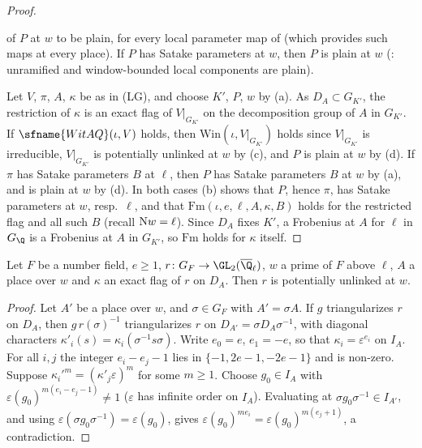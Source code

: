 \begin{proof}
\begin{enumerate}[label=(\alph*)]
  of $P$ at $w$ to be plain, for every local parameter map of  (which
  provides such maps at every place). If $P$ has Satake parameters at $w$, then $P$ is plain at $w$
  (: unramified and window-bounded local components are plain).
\end{enumerate}
Let $V$, $\pi$, $A$, $\kappa$ be as in \textup{(LG)}, and choose $K'$, $P$, $w$ by (a). As $D_A\subset G_{K'}$, the
restriction of $\kappa$ is an exact flag of $V|_{G_{K'}}$ on the decomposition group of $A$ in $G_{K'}$. If
$\sfname{WitAQ}(\iota,V)$ holds, then $\mathrm{Win}(\iota,V|_{G_{K'}})$ holds since $V|_{G_{K'}}$ is irreducible,
$V|_{G_{K'}}$ is potentially unlinked at $w$ by (c), and $P$ is plain at $w$ by (d). If $\pi$ has Satake
parameters $B$ at $\ell$, then $P$ has Satake parameters $B$ at $w$ by (a), and is plain at $w$ by (d). In both
cases (b) shows that $P$, hence $\pi$, has Satake parameters at $w$, resp.\ $\ell$, and that
$\mathrm{Fm}(\iota,e,\ell,A,\kappa,B)$ holds for the restricted flag and all such $B$ (recall $\mathrm{N} w=\ell$).
Since $D_A$ fixes $K'$, a Frobenius at $A$ for $\ell$ in $G_\Q$ is a Frobenius at $A$ in $G_{K'}$, so
$\mathrm{Fm}$ holds for $\kappa$ itself.
\end{proof}

\begin{lemma}\label{pf:kato:potof}
Let $F$ be a number field, $e\ge1$, $r\colon G_F\to\GL_2(\katoQlb)$, $w$ a prime of $F$ above $\ell$, $A$ a place
over $w$ and $\kappa$ an exact flag of $r$ on $D_A$. Then $r$ is potentially unlinked at $w$.
\end{lemma}

\begin{proof}
Let $A'$ be a place over $w$, and $\sigma\in G_F$ with $A'=\sigma A$. If $g$ triangularizes $r$ on $D_A$, then
$g\,r(\sigma)^{-1}$ triangularizes $r$ on $D_{A'}=\sigma D_A\sigma^{-1}$, with diagonal characters
$\kappa'_i(s)=\kappa_i(\sigma^{-1}s\sigma)$. Write $e_0=e$, $e_1=-e$, so that $\kappa_i=\varepsilon^{e_i}$ on $I_A$. For all
$i,j$ the integer $e_i-e_j-1$ lies in $\{-1,2e-1,-2e-1\}$ and is non-zero. Suppose
$\kappa_i'^m=(\kappa'_j\varepsilon)^m$ for some $m\ge1$. Choose $g_0\in I_A$ with
$\varepsilon(g_0)^{m(e_i-e_j-1)}\ne1$ ($\varepsilon$ has infinite order on $I_A$). Evaluating at $\sigma g_0\sigma^{-1}\in I_{A'}$,
and using $\varepsilon(\sigma g_0\sigma^{-1})=\varepsilon(g_0)$, gives $\varepsilon(g_0)^{me_i}=\varepsilon(g_0)^{m(e_j+1)}$, a contradiction.
\end{proof}

